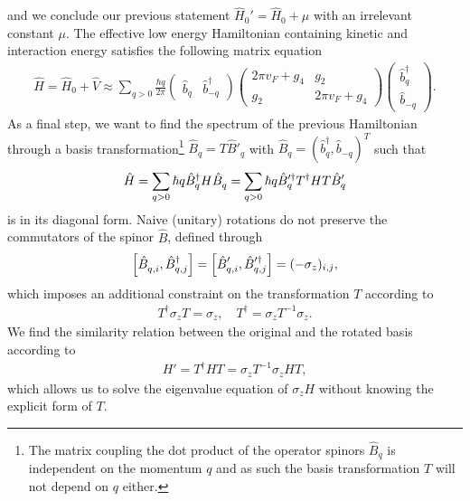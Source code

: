 and we conclude our previous statement $\hat H_0' = \hat H_0 + \mu$ with an irrelevant constant $\mu$.
The effective low energy Hamiltonian containing kinetic and interaction energy satisfies the following matrix equation
\begin{align}
    \hat H = \hat H_0 + \hat V \approx
    \sum_{q>0}\frac{\hbar q}{2\pi}
    \begin{pmatrix}
        \hat b_q & \hat b^\dag_{-q}
    \end{pmatrix}
    \begin{pmatrix}
        2\pi v_F + g_4 & g_2 \\
        g_2 & 2\pi v_F + g_4
    \end{pmatrix}
    \begin{pmatrix}
        \hat b^\dag_q \\ \hat b_{-q}
    \end{pmatrix}
    .
    \label{eq:luttinger_hamiltonian_nondiagonal}
\end{align}
As a final step, we want to find the spectrum of the previous Hamiltonian through a basis transformation\footnote{The matrix coupling the dot product of the operator spinors $\hat B_q$ is independent on the momentum $q$ and as such the basis transformation $T$ will not depend on $q$ either.} $\hat B_q = T \hat B'_q$ with $\hat B_q = (\hat b_q^\dag, \hat b_{-q})^T$ such that
\begin{align}
    \hat H = \sum_{q>0}\hbar q\hat B^\dag_q H \hat B^\pdag_q = \sum_{q>0}\hbar q\hat B'^\dag_q T^\dag H T \hat B'^\pdag_q
\end{align}
is in its diagonal form.
Naive (unitary) rotations do not preserve the commutators of the spinor $\hat B$, defined through
\begin{align}
    \commutator{\hat B_{q,i}^\pdag,\hat B^\dag_{q,j}} = \commutator{\hat B_{q,i}'^\pdag,\hat B'^\dag_{q,j}} = (-\sigma_z)_{i,j},
\end{align}
which imposes an additional constraint on the transformation $T$ according to
\begin{align}
    T^\dag\sigma_z T = \sigma_z,
    \quad
    T^\dag = \sigma_zT^{-1}\sigma_z.
\end{align}
We find the similarity relation between the original and the rotated basis according to
\begin{align}
    H'=T^\dag HT =\sigma_z T^{-1}\sigma_z H T,
\end{align}
which allows us to solve the eigenvalue equation of $\sigma_z H$ without knowing the explicit form of $T$.
